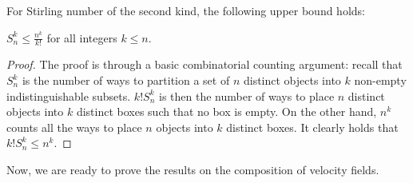 For Stirling number of the second kind, the following upper bound holds:
\begin{lemma}\label{lemma:StirlingUpperbound}
$S_n^k \leq \frac{n^k}{k!}$ for all integers $k\leq n$.
\end{lemma}
\begin{proof}
The proof is through a basic combinatorial counting argument: recall that $S_n^k$ is the number of ways to partition a set of $n$ distinct objects into $k$ non-empty indistinguishable subsets. $k!S_n^k$ is then the number of ways to place $n$ distinct objects into $k$ distinct boxes such that no box is empty. On the other hand, $n^k$ counts all the ways to place $n$ objects into $k$ distinct boxes. It clearly holds that $k!S_n^k \leq n^k$. 
\end{proof}




Now, we are ready to prove the results on the composition of velocity fields.


